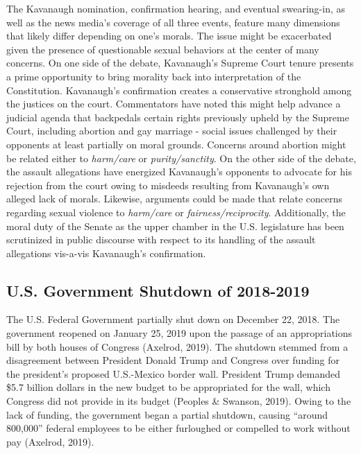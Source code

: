 \documentclass[english,,man]{apa6}
\begin{document}
The Kavanaugh nomination, confirmation hearing, and eventual
swearing-in, as well as the news media's coverage of all three events,
feature many dimensions that likely differ depending on one's morals.
The issue might be exacerbated given the presence of questionable sexual
behaviors at the center of many concerns. On one side of the debate,
Kavanaugh's Supreme Court tenure presents a prime opportunity to bring
morality back into interpretation of the Constitution. Kavanaugh's
confirmation creates a conservative stronghold among the justices on the
court. Commentators have noted this might help advance a judicial agenda
that backpedals certain rights previously upheld by the Supreme Court,
including abortion and gay marriage - social issues challenged by their
opponents at least partially on moral grounds. Concerns around abortion
might be related either to \emph{harm/care} or \emph{purity/sanctity}.
On the other side of the debate, the assault allegations have energized
Kavanaugh's opponents to advocate for his rejection from the court owing
to misdeeds resulting from Kavanaugh's own alleged lack of morals.
Likewise, arguments could be made that relate concerns regarding sexual
violence to \emph{harm/care} or \emph{fairness/reciprocity}.
Additionally, the moral duty of the Senate as the upper chamber in the
U.S. legislature has been scrutinized in public discourse with respect
to its handling of the assault allegations vis-a-vis Kavanaugh's
confirmation.

\subsection{U.S. Government Shutdown of
2018-2019}\label{u.s.-government-shutdown-of-2018-2019}

The U.S. Federal Government partially shut down on December 22, 2018.
The government reopened on January 25, 2019 upon the passage of an
appropriations bill by both houses of Congress (Axelrod, 2019). The
shutdown stemmed from a disagreement between President Donald Trump and
Congress over funding for the president's proposed U.S.-Mexico border
wall. President Trump demanded \$5.7 billion dollars in the new budget
to be appropriated for the wall, which Congress did not provide in its
budget (Peoples \& Swanson, 2019). Owing to the lack of funding, the
government began a partial shutdown, causing \enquote{around 800,000}
federal employees to be either furloughed or compelled to work without
pay (Axelrod, 2019).
\end{document}
